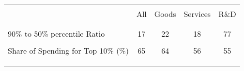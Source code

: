 

\begin{tabular}{l cccc} \hline 
\vspace{-2pt} & \vspace{-2pt} & \vspace{-2pt} & \vspace{-2pt} & \vspace{-2pt} \\
& All & Goods & Services & R\&D \\
\vspace{-2pt} & \vspace{-2pt} & \vspace{-2pt} & \vspace{-2pt} & \vspace{-2pt} \\ \hline
\vspace{-0.7pt} & \vspace{-0.7pt} & \vspace{-0.7pt} & \vspace{-0.7pt} & \vspace{-0.7pt} \\ 

90\%-to-50\%-percentile Ratio & 17 & 22 & 18 & 77 \\
\vspace{-2pt} & \vspace{-2pt} & \vspace{-2pt} & \vspace{-2pt} & \vspace{-2pt} \\

Share of Spending for Top 10\% (\%) & 65 & 64 & 56 & 55 \\
\vspace{-2pt} & \vspace{-2pt} & \vspace{-2pt} & \vspace{-2pt} & \vspace{-2pt} \\

\vspace{-0.7pt} & \vspace{-0.7pt} & \vspace{-0.7pt} & \vspace{-0.7pt} & \vspace{-0.7pt} \\ \hline 

\vspace{-1.5pt} & \vspace{-1.5pt} & \vspace{-1.5pt} & \vspace{-1.5pt} & \vspace{-1.5pt} \\


\end{tabular}
